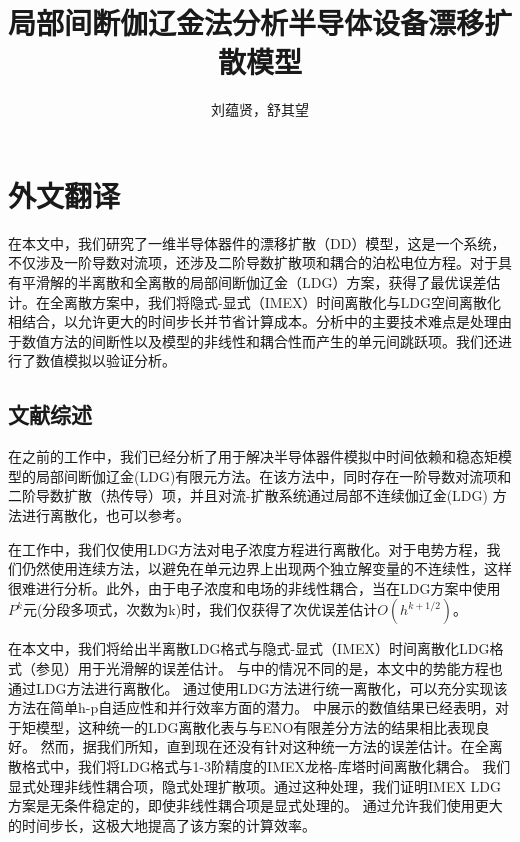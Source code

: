 \cleardoublepage

\newrefsection
\sectionmajornumbering

\chapter{外文翻译}
\title{局部间断伽辽金法分析半导体设备漂移扩散模型}
\author{刘蕴贤，舒其望}
\date{}
\maketitle
{}
在本文中，我们研究了一维半导体器件的漂移扩散（DD）模型，这是一个系统，不仅涉及一阶导数对流项，还涉及二阶导数扩散项和耦合的泊松电位方程。对于具有平滑解的半离散和全离散的局部间断伽辽金（LDG）方案，获得了最优误差估计。在全离散方案中，我们将隐式-显式（IMEX）时间离散化与LDG空间离散化相结合，以允许更大的时间步长并节省计算成本。分析中的主要技术难点是处理由于数值方法的间断性以及模型的非线性和耦合性而产生的单元间跳跃项。我们还进行了数值模拟以验证分析。

\section{文献综述}
在之前的工作\parencite{liu2010errorc}中，我们已经分析了用于解决半导体器件模拟中时间依赖和稳态矩模型的局部间断伽辽金(LDG)有限元方法。在该方法中，同时存在一阶导数对流项和二阶导数扩散（热传导）项，并且对流-扩散系统通过局部不连续伽辽金(LDG) 方法进行离散化\parencite{cockburn1998local,cockburn2001runge}，也可以参考\parencite{bank1983numerical,bank1998finite,chainais2003finite,bessemoulin2012finite}。

在工作\parencite{liu2010errorc}中，我们仅使用LDG方法对电子浓度方程进行离散化。对于电势方程，我们仍然使用连续方法，以避免在单元边界上出现两个独立解变量的不连续性，这样很难进行分析。此外，由于电子浓度和电场的非线性耦合，当在LDG方案中使用$P^k$元(分段多项式，次数为k)时，我们仅获得了次优误差估计$O(h^{k+1/2})$。

在本文中，我们将给出半离散LDG格式与隐式-显式（IMEX）时间离散化LDG格式（参见\parencite{wang2015stability,wang2015stabilityd}）用于光滑解的误差估计。
与\parencite{liu2010errorc}中的情况不同的是，本文中的势能方程也通过LDG方法进行离散化。
通过使用LDG方法进行统一离散化，可以充分实现该方法在简单h-p自适应性和并行效率方面的潜力。
\parencite{liu2004local,liu2007locala}中展示的数值结果已经表明，对于矩模型，这种统一的LDG离散化表与与ENO有限差分方法\parencite{jerome1994energy}的结果相比表现良好。
然而，据我们所知，直到现在还没有针对这种统一方法的误差估计。在全离散格式中，我们将LDG格式与1-3阶精度的IMEX龙格-库塔时间离散化耦合。
我们显式处理非线性耦合项，隐式处理扩散项。通过这种处理，我们证明IMEX LDG方案是无条件稳定的，即使非线性耦合项是显式处理的。
通过允许我们使用更大的时间步长，这极大地提高了该方案的计算效率。

